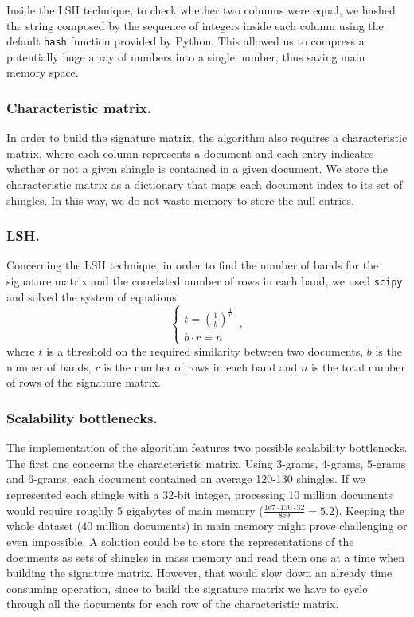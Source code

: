 \documentclass[runningheads]{llncs}
\begin{document}
Inside the LSH technique, to check whether two columns were equal, we hashed the string composed by the sequence of integers inside each column using the default \texttt{hash} function provided by Python. This allowed us to compress a potentially huge array of numbers into a single number, thus saving main memory space. 

\subsubsection{Characteristic matrix.} In order to build the signature matrix, the algorithm also requires a characteristic matrix, where each column represents a document and each entry indicates whether or not a given shingle is contained in a given document. We store the characteristic matrix as a dictionary that maps each document index to its set of shingles. In this way, we do not waste memory to store the null entries.

\subsubsection{LSH.} Concerning the LSH technique, in order to find the number of bands for the signature matrix and the correlated number of rows in each band, we used \texttt{scipy} and solved the system of equations
\begin{equation*}
  \begin{cases}
    t = (\frac{1}{b})^\frac{1}{r}\\
    b \cdot r = n
  \end{cases}\,,
\end{equation*}
where $t$ is a threshold on the required similarity between two documents, $b$ is the number of bands, $r$ is the number of rows in each band and $n$ is the total number of rows of the signature matrix.

\subsubsection{Scalability bottlenecks.} The implementation of the algorithm features two possible scalability bottlenecks. The first one concerns the characteristic matrix. Using 3-grams, 4-grams, 5-grams and 6-grams, each document contained on average 120-130 shingles. If we represented each shingle with a 32-bit integer, processing 10 million documents would require roughly 5 gigabytes of main memory ($\frac{1\text{e}7 \cdot 130 \cdot 32}{8\text{e}9} = 5.2$). Keeping the whole dataset (40 million documents) in main memory might prove challenging or even impossible. A solution could be to store the representations of the documents as sets of shingles in mass memory and read them one at a time when building the signature matrix. However, that would slow down an already time consuming operation, since to build the signature matrix we have to cycle through all the documents for each row of the characteristic matrix.
\end{document}
